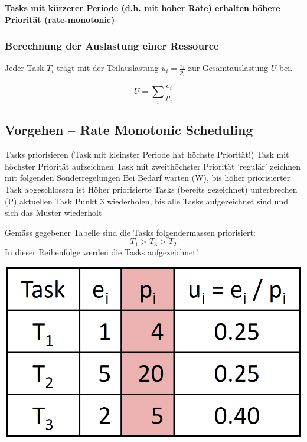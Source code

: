 \vspace{0.1cm}

\textbf{Tasks mit kürzerer Periode (d.h. mit hoher Rate) erhalten höhere Priorität (rate-monotonic)}


\subsubsection{Berechnung der Auslastung einer Ressource}

\begin{minipage}[t]{0.48\columnwidth}
    Jeder Task $T_i$ trägt mit der Teilauslastung $u_i = \frac{e_i}{p_i}$ zur Gesamtauslastung $U$ bei.
\end{minipage}
\hfill
\begin{minipage}[t]{0.48\columnwidth}
    $$ U = \sum\limits_{i} \frac{e_i}{p_i} $$
\end{minipage}


\subsection{Vorgehen -- Rate Monotonic Scheduling}

\begingroup
\renewcommand{\outlinei}{enumerate}
\renewcommand{\outlineii}{itemize}
\begin{outline}
    \1 Tasks priorisieren (Task mit kleinster Periode hat höchste Priorität!)
    \1 Task mit höchster Priorität aufzeichnen
    \1 Task mit zweithöchster Priorität 'regulär' zeichnen mit folgenden Sonderregelungen
        \2 Bei Bedarf warten (W), bis höher priorisierter Task abgeschlossen ist 
        \2 Höher priorisierte Tasks (bereits gezeichnet) unterbrechen (P) aktuellen Task
    \1 Punkt 3 wiederholen, bis alle Tasks aufgezeichnet sind und sich das Muster wiederholt
\end{outline}
\endgroup



\begin{minipage}[t]{0.48\columnwidth}
    Gemäss gegebener Tabelle sind die Tasks folgendermassen priorisiert:
    $$ T_1 > T_3 > T_2 $$
    In dieser Reihenfolge werden die Tasks aufgezeichnet!
\end{minipage}
\hfill
\begin{minipage}[t]{0.4\columnwidth}
    \includegraphics[width=\columnwidth, align=t]{images/scheduling_RMS_example_tabelle.png}
\end{minipage}

